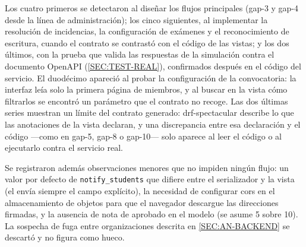 Los cuatro primeros se detectaron al diseñar los flujos principales (gap-3 y gap-4 desde la
línea de administración); los cinco siguientes, al implementar la resolución de incidencias,
la configuración de exámenes y el reconocimiento de escritura, cuando el contrato se
contrastó con el código de las vistas; y los dos últimos, con la prueba que valida las
respuestas de la simulación contra el documento OpenAPI (\cref{SEC:TEST-REAL}), confirmados
después en el código del servicio. El duodécimo apareció al probar la configuración de la
convocatoria: la interfaz leía solo la primera página de miembros, y al buscar en la vista
cómo filtrarlos se encontró un parámetro que el contrato no recoge. Las dos últimas series muestran un límite del contrato
generado: drf-spectacular describe lo que las anotaciones de la vista declaran, y una
discrepancia entre esa declaración y el código ---como en gap-5, gap-8 o gap-10--- solo
aparece al leer el código o al ejecutarlo contra el servicio real.

Se registraron además observaciones menores que no impiden ningún flujo: un valor por
defecto de \texttt{notify\_students} que difiere entre el serializador y la vista (el
 envía siempre el campo explícito), la necesidad de configurar \acs{cors} en el
almacenamiento de objetos para que el navegador descargue las direcciones firmadas, y la
ausencia de nota de aprobado en el modelo (se asume 5 sobre 10). La sospecha de fuga entre
organizaciones descrita en \cref{SEC:AN-BACKEND} se descartó y no figura como hueco.

